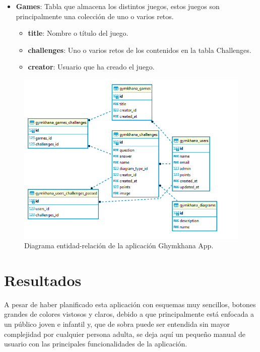 \documentclass[a4paper, 12pt]{book}
\begin{document}
\begin{itemize}
	\item \textbf {Games}: Tabla que almacena los distintos juegos, estos juegos son principalmente una colección de uno o varios retos. 
	\begin{itemize}
		\item \textbf {title}: Nombre o título del juego. 
		\item \textbf {challenges}: Uno o varios retos de los contenidos en la tabla Challenges. 
		\item \textbf {creator}: Usuario que ha creado el juego. 
	\end{itemize}
	
\end{itemize}

\begin{figure}
	\centering
	\includegraphics[width=16cm, keepaspectratio]{img/gymkhana_ER.png}
	\caption{Diagrama entidad-relación de la aplicación Ghymkhana App.}\label{fig:diagarma_ER}
\end{figure}



\cleardoublepage
\chapter{Resultados}
\label{cap:resultados}

A pesar de haber planificado esta aplicación con esquemas muy sencillos, botones grandes de colores vistosos y claros, debido a que principalmente está enfocada a un público joven e infantil y, que de sobra puede ser entendida sin mayor complejidad por cualquier persona adulta, se deja aquí un pequeño manual de usuario con las principales funcionalidades de la aplicación. \\
\end{document}
